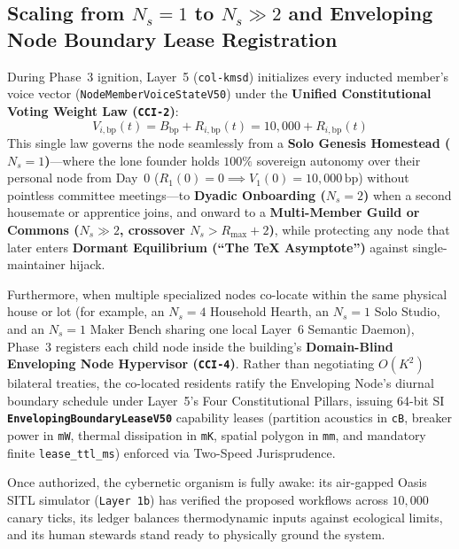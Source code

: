 \subsection{Scaling from \texorpdfstring{$N_s = 1$ to $N_s \gg 2$}{N\_s = 1 to N\_s >> 2} and Enveloping Node Boundary Lease Registration}

During Phase~3 ignition, Layer~5 (\texttt{col-kmsd}) initializes every inducted member's voice vector (\texttt{NodeMemberVoiceStateV50}) under the \textbf{Unified Constitutional Voting Weight Law (\texttt{CCI-2})}:
\begin{equation}
V_{i,\mathrm{bp}}(t) = B_{\mathrm{bp}} + R_{i,\mathrm{bp}}(t) = 10{,}000 + R_{i,\mathrm{bp}}(t)
\label{eq:ch9_genesis_voting}
\end{equation}
This single law governs the node seamlessly from a \textbf{Solo Genesis Homestead ($N_s = 1$)}---where the lone founder holds $100\%$ sovereign autonomy over their personal node from Day~0 ($R_1(0) = 0 \implies V_1(0) = 10{,}000\,\mathrm{bp}$) without pointless committee meetings---to \textbf{Dyadic Onboarding ($N_s = 2$)} when a second housemate or apprentice joins, and onward to a \textbf{Multi-Member Guild or Commons ($N_s \gg 2$, crossover $N_s > R_{\max} + 2$)}, while protecting any node that later enters \textbf{Dormant Equilibrium (``The \TeX{} Asymptote'')} against single-maintainer hijack.

Furthermore, when multiple specialized nodes co-locate within the same physical house or lot (for example, an $N_s = 4$ Household Hearth, an $N_s = 1$ Solo Studio, and an $N_s = 1$ Maker Bench sharing one local Layer~6 Semantic Daemon), Phase~3 registers each child node inside the building's \textbf{Domain-Blind Enveloping Node Hypervisor (\texttt{CCI-4})}. Rather than negotiating $O(K^2)$ bilateral treaties, the co-located residents ratify the Enveloping Node's diurnal boundary schedule under Layer~5's Four Constitutional Pillars, issuing 64-bit SI \textbf{\texttt{EnvelopingBoundaryLeaseV50}} capability leases (partition acoustics in \texttt{cB}, breaker power in \texttt{mW}, thermal dissipation in \texttt{mK}, spatial polygon in \texttt{mm}, and mandatory finite \texttt{lease\_ttl\_ms}) enforced via Two-Speed Jurisprudence.

Once authorized, the cybernetic organism is fully awake: its air-gapped Oasis SITL simulator (\texttt{Layer 1b}) has verified the proposed workflows across $10{,}000$ canary ticks, its ledger balances thermodynamic inputs against ecological limits, and its human stewards stand ready to physically ground the system.

